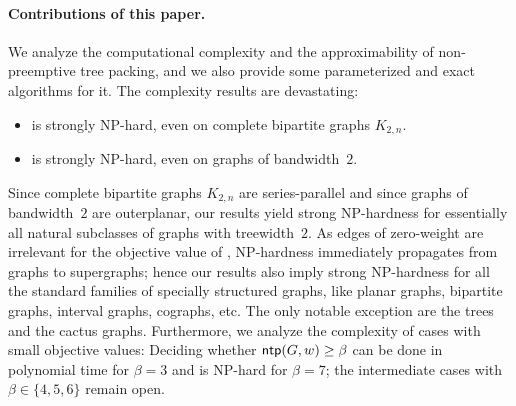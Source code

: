 
\paragraph{Contributions of this paper.}
We analyze the computational complexity and the approximability of non-preemptive 
tree packing, and we also provide some parameterized and exact algorithms for it.
The complexity results are devastating:
\begin{itemize}
\item {\xxxNTP} is strongly NP-hard, even on complete bipartite graphs $K_{2,n}$. 
\item {\xxxNTP} is strongly NP-hard, even on graphs of bandwidth~$2$.
\end{itemize}
Since complete bipartite graphs $K_{2,n}$ are series-parallel and since graphs of 
bandwidth~$2$ are outerplanar, our results yield strong NP-hardness for essentially 
all natural subclasses of graphs with treewidth~$2$.
As edges of zero-weight are irrelevant for the objective value of {\xxxNTP}, NP-hardness 
immediately propagates from graphs to supergraphs; hence our results also imply 
strong NP-hardness for all the standard families of specially structured graphs, 
like planar graphs, bipartite graphs, interval graphs, cographs, etc.
The only notable exception are the trees and the cactus graphs.
Furthermore, we analyze the complexity of cases with small objective values:
Deciding whether $\operatorname{\textsf{ntp}}(G,w)\ge\beta$ can be done in polynomial time for $\beta=3$
and is NP-hard for $\beta=7$; the intermediate cases with $\beta\in\{4,5,6\}$ remain open.

